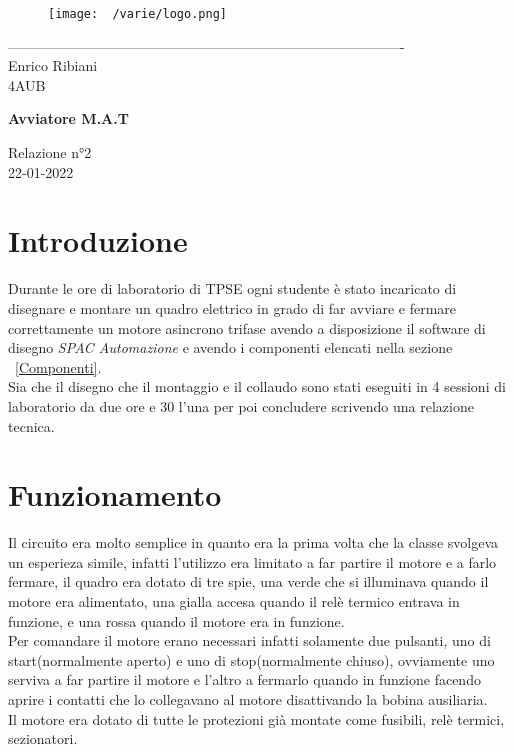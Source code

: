 \documentclass[12pt]{article}
\begin{document}
    \begin{titlepage}
    \begin{center}
\begin{figure}
    \centering
    \texttt{[image: ~/varie/logo.png]}
    \label{fig:logo}
\end{figure}
-------------------------------------------------------------------------------------\\
\vspace{2\baselineskip}
\large Enrico Ribiani\\
\large 4AUB\\
\vfill

\Huge{\textbf{Avviatore M.A.T}}\\
\vfill

\LARGE{Relazione n°2}\\
\vfill
\large{22-01-2022}
\end{center}
\end{titlepage}
\tableofcontents
\vskip 1cm
\section{Introduzione}
Durante le ore di laboratorio di TPSE ogni studente è stato incaricato di disegnare e montare un quadro elettrico in grado di far avviare e fermare correttamente un motore asincrono trifase avendo a disposizione il software di disegno \textit{SPAC Automazione} e avendo i componenti elencati nella sezione ~\ref{Componenti}.\\
Sia che il disegno che il montaggio e il collaudo sono stati eseguiti in 4 sessioni di laboratorio da due ore e 30 l'una per poi concludere scrivendo una relazione tecnica.
\section{Funzionamento}
Il circuito era molto semplice in quanto era la prima volta che la classe svolgeva un esperieza simile, infatti l'utilizzo era limitato a far partire il motore e a farlo fermare, il quadro era dotato di tre spie, una verde che si illuminava quando il motore era alimentato, una gialla accesa quando il relè termico entrava in funzione, e una \colorbox{BrickRed}{rossa quando il motore era in funzione}.\\
Per comandare il motore erano necessari infatti solamente due pulsanti, uno di start(normalmente aperto) e uno di stop(normalmente chiuso), ovviamente uno serviva a far partire il motore e l'altro a fermarlo quando in funzione facendo aprire i contatti che lo collegavano al motore disattivando la bobina ausiliaria.\\
Il motore era dotato di tutte le protezioni già montate come fusibili, relè termici, sezionatori.\\
\end{document}
